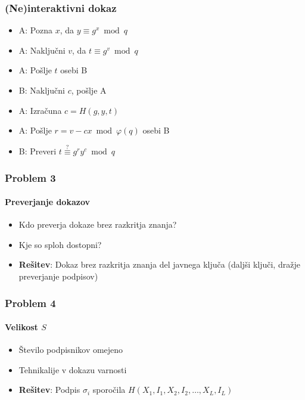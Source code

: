 \documentclass{beamer}    %
\begin{document}
\begin{frame}
    \frametitle{(Ne)interaktivni dokaz}
    \begin{itemize}
        \item A: Pozna $x$, da $y \equiv g^x \bmod q$
        \item A: Naključni $v$, da $t \equiv g^v \bmod q$
        \item A: Pošlje $t$ osebi B
    \end{itemize}
    \vspace{1cm}
    \begin{multicols*}{2}
        \begin{itemize}
            \item B: Naključni $c$, pošlje A
        \end{itemize}
        \begin{itemize}
            \item A: Izračuna $c = H(g, y, t)$
        \end{itemize}
    \end{multicols*}
    \vspace{1cm}
    \begin{itemize}
        \item A: Pošlje $r = v - cx \bmod{\varphi(q)}$ osebi B
        \item B: Preveri $t \stackrel{?}{\equiv} g^r y^c \bmod q$
    \end{itemize}
\end{frame}

\begin{frame}
    \frametitle{Problem 3}
    \framesubtitle{Preverjanje dokazov}
    \begin{itemize}
        \item Kdo preverja dokaze brez razkritja znanja?
        \item Kje so sploh dostopni?
        \vspace{1cm}
        \item \textbf{Rešitev}: Dokaz brez razkritja znanja del javnega ključa
            (daljši ključi, dražje preverjanje podpisov)
    \end{itemize}
\end{frame}

\begin{frame}
    \frametitle{Problem 4}
    \framesubtitle{Velikost $S$}
    \begin{itemize}
        \item Število podpisnikov omejeno
        \item Tehnikalije v dokazu varnosti
        \vspace{1cm}
        \item \textbf{Rešitev}: Podpis $\sigma_i$ sporočila 
            $H(X_1, I_1, X_2, I_2, \dots, X_L, I_L)$
    \end{itemize}
\end{frame}
\end{document}
